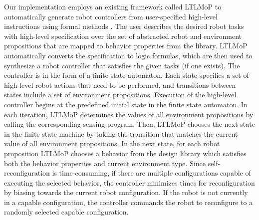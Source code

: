 \documentclass[journal]{IEEEtran}
\begin{document}
Our implementation employs an existing framework called LTLMoP to automatically generate robot controllers from user-specified high-level instructions using formal methods \cite{DBLP:conf/iros/FinucaneJK10,DBLP:journals/trob/Kress-GazitFP09}.
The user describes the desired robot tasks with high-level specification over the set of abstracted robot and environment propositions that are mapped to behavior properties from the library.
LTLMoP automatically converts the specification to logic formulas, which are then used to synthesize a robot controller that satisfies the given tasks (if one exists).
The controller is in the form of a finite state automaton.
Each state specifies a set of high-level robot actions that need to be performed, and transitions between states include a set of environment propositions.
Execution of the high-level controller begins at the predefined initial state in the finite state automaton. In each iteration, LTLMoP determines the values of all environment propositions by calling the corresponding sensing program. Then, LTLMoP chooses the next state in the finite state machine by taking the transition that matches the current value of all environment propositions. 
In the next state, for each robot proposition LTLMoP chooses a behavior from the design library which satisfies both the behavior properties and current environment type.
Since self-reconfiguration is time-consuming, if there are multiple configurations capable of executing the selected behavior, the controller minimizes times for reconfiguration by biasing towards the current robot configuration.
If the robot is not currently in a capable configuration, the controller commands the robot to reconfigure to a randomly selected capable configuration.

\end{document}
